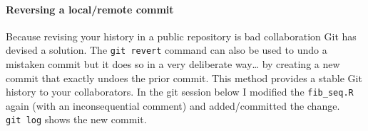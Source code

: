 \documentclass[
  letterpaper,
  DIV=11,
  numbers=noendperiod]{scrreprt}
\let\oldparagraph\paragraph
\renewcommand{\paragraph}[1]{\oldparagraph{#1}\mbox{}}
\begin{document}
\hypertarget{reversing-a-localremote-commit}{%
\paragraph{Reversing a local/remote
commit}\label{reversing-a-localremote-commit}}

Because revising your history in a public repository is bad
collaboration Git has devised a solution. The \texttt{git\ revert}
command can also be used to undo a mistaken commit but it does so in a
very deliberate way\ldots{} by creating a new commit that exactly undoes
the prior commit. This method provides a stable Git history to your
collaborators. In the git session below I modified the
\texttt{fib\_seq.R} again (with an inconsequential comment) and
added/committed the change. \texttt{git\ log} shows the new commit.
\end{document}
